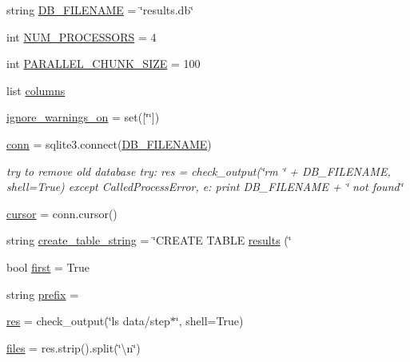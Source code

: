 \begin{DoxyCompactItemize}
\item 
string \hyperlink{namespacecreate__db_a3627484d56c47b0a96fdb9ff199694df}{D\+B\+\_\+\+F\+I\+L\+E\+N\+A\+ME} = \char`\"{}results.\+db\char`\"{}
\item 
int \hyperlink{namespacecreate__db_a2da1873dcc0f1772f769b24a8afb0cc9}{N\+U\+M\+\_\+\+P\+R\+O\+C\+E\+S\+S\+O\+RS} = 4
\item 
int \hyperlink{namespacecreate__db_af0cf695fe45d12d416c1722b2fd80b0c}{P\+A\+R\+A\+L\+L\+E\+L\+\_\+\+C\+H\+U\+N\+K\+\_\+\+S\+I\+ZE} = 100
\item 
list \hyperlink{namespacecreate__db_af3656325d8df791e2e0e62165f52e0d0}{columns}
\item 
\hyperlink{namespacecreate__db_a28aa7edc413f11b3b8aa50029c43c98f}{ignore\+\_\+warnings\+\_\+on} = set(\mbox{[}\char`\"{}\char`\"{}\mbox{]})
\item 
\hyperlink{namespacecreate__db_acaffbe61c8fe2c0d0db0765f1d0a2b24}{conn} = sqlite3.\+connect(\hyperlink{namespacecreate__db_a3627484d56c47b0a96fdb9ff199694df}{D\+B\+\_\+\+F\+I\+L\+E\+N\+A\+ME})
\begin{DoxyCompactList}\small\item\em try to remove old database try\+: res = check\+\_\+output(\char`\"{}rm \char`\"{} + D\+B\+\_\+\+F\+I\+L\+E\+N\+A\+ME, shell=True) except Called\+Process\+Error, e\+: print D\+B\+\_\+\+F\+I\+L\+E\+N\+A\+ME + \char`\"{} not found\char`\"{} \end{DoxyCompactList}\item 
\hyperlink{namespacecreate__db_a8caadce67a98b8a3d859ceae2775bf63}{cursor} = conn.\+cursor()
\item 
string \hyperlink{namespacecreate__db_a753b199ce11002d6f6c93550a6bf31ec}{create\+\_\+table\+\_\+string} = \char`\"{}C\+R\+E\+A\+TE T\+A\+B\+LE \hyperlink{namespacecreate__db_a7926ceddf2e86e190ed055e87168b4d5}{results} (\char`\"{}
\item 
bool \hyperlink{namespacecreate__db_a4335e951e2857562798d08f99d34703c}{first} = True
\item 
string \hyperlink{namespacecreate__db_a3618610b83bddd5732bbdb1707b93c54}{prefix} = \textquotesingle{}\textquotesingle{}
\item 
\hyperlink{namespacecreate__db_aa349dd30992f59754d744dd90a252664}{res} = check\+\_\+output(\char`\"{}ls data/step$\ast$\char`\"{}, shell=True)
\item 
\hyperlink{namespacecreate__db_ae907838b4f6feec6455ce38eba8a26fe}{files} = res.\+strip().split(\char`\"{}\textbackslash{}n\char`\"{})

\end{DoxyCompactItemize}
